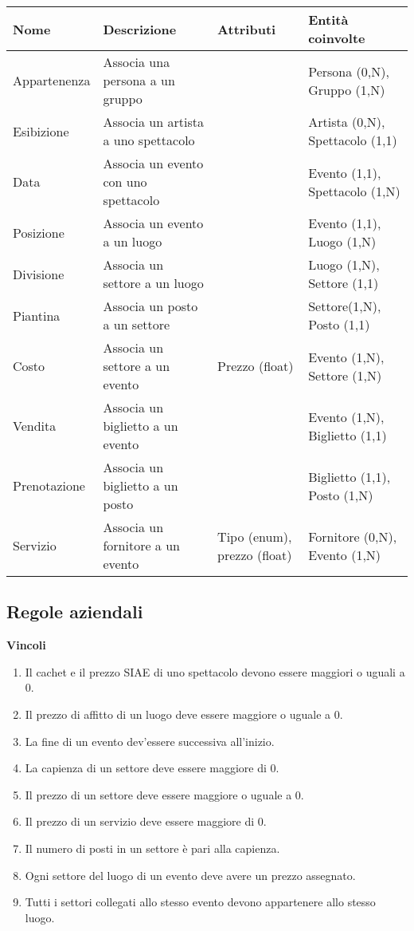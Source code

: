 \documentclass[a4paper,11pt]{article}
\begin{document}
\begin{tabularx}{\textwidth}{|X|>{\raggedright\arraybackslash}X|>{\raggedright\arraybackslash}X|>{\raggedright\arraybackslash}X|}
\hline
\textbf{Nome} & \textbf{Descrizione} & \textbf{Attributi} & \textbf{Entità coinvolte}\\
\hline
Appartenenza & Associa una persona a un gruppo & & Persona (0,N), Gruppo (1,N)\\
\hline
Esibizione & Associa un artista a uno spettacolo & & Artista (0,N), Spettacolo (1,1)\\
\hline
Data & Associa un evento con uno spettacolo & & Evento (1,1), Spettacolo (1,N)\\
\hline
Posizione & Associa un evento a un luogo & & Evento (1,1), Luogo (1,N)\\
\hline
Divisione & Associa un settore a un luogo & & Luogo (1,N), Settore (1,1)\\
\hline
Piantina & Associa un posto a un settore & & Settore(1,N), Posto (1,1)\\
\hline
Costo & Associa un settore a un evento & Prezzo (float) & Evento (1,N), Settore (1,N)\\
\hline
Vendita & Associa un biglietto a un evento & & Evento (1,N), Biglietto (1,1)\\
\hline
Prenotazione & Associa un biglietto a un posto & & Biglietto (1,1), Posto (1,N)\\
\hline
Servizio & Associa un fornitore a un evento & Tipo (enum), prezzo (float) & Fornitore (0,N), Evento (1,N)\\
\hline
\end{tabularx}

\subsection{Regole aziendali}

\textbf{Vincoli}

\begin{enumerate}[label=$\bullet$\hspace{.5em}(RV\arabic*),leftmargin=6em,ref=RV\theenumi]
  \item Il cachet e il prezzo SIAE di uno spettacolo devono essere maggiori o uguali a 0.
  \item Il prezzo di affitto di un luogo deve essere maggiore o uguale a 0.
  \item La fine di un evento dev'essere successiva all'inizio.
  \item La capienza di un settore deve essere maggiore di 0.
  \item Il prezzo di un settore deve essere maggiore o uguale a 0.
  \item Il prezzo di un servizio deve essere maggiore di 0.
  \item Il numero di posti in un settore è pari alla capienza.
  \item \label{rv7} Ogni settore del luogo di un evento deve avere un prezzo assegnato.
  \item \label{rv8} Tutti i settori collegati allo stesso evento devono appartenere allo stesso luogo.
\end{enumerate}
\end{document}
